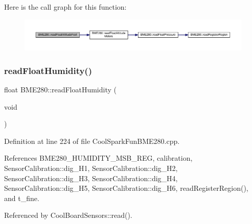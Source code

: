 Here is the call graph for this function\+:\nopagebreak
\begin{figure}[H]
\begin{center}
\leavevmode
\includegraphics[width=350pt]{df/dcf/class_b_m_e280_a6525c8a26f887b52596c86bed99343cb_cgraph}
\end{center}
\end{figure}
\mbox{\label{class_b_m_e280_a42ea7232039eebf5aadb391ef6132c35}} 
\subsubsection{\texorpdfstring{read\+Float\+Humidity()}{readFloatHumidity()}}
{\footnotesize\ttfamily float B\+M\+E280\+::read\+Float\+Humidity (\begin{DoxyParamCaption}\item[{void}]{ }\end{DoxyParamCaption})}



Definition at line 224 of file Cool\+Spark\+Fun\+B\+M\+E280.\+cpp.



References B\+M\+E280\+\_\+\+H\+U\+M\+I\+D\+I\+T\+Y\+\_\+\+M\+S\+B\+\_\+\+R\+EG, calibration, Sensor\+Calibration\+::dig\+\_\+\+H1, Sensor\+Calibration\+::dig\+\_\+\+H2, Sensor\+Calibration\+::dig\+\_\+\+H3, Sensor\+Calibration\+::dig\+\_\+\+H4, Sensor\+Calibration\+::dig\+\_\+\+H5, Sensor\+Calibration\+::dig\+\_\+\+H6, read\+Register\+Region(), and t\+\_\+fine.



Referenced by Cool\+Board\+Sensors\+::read().

